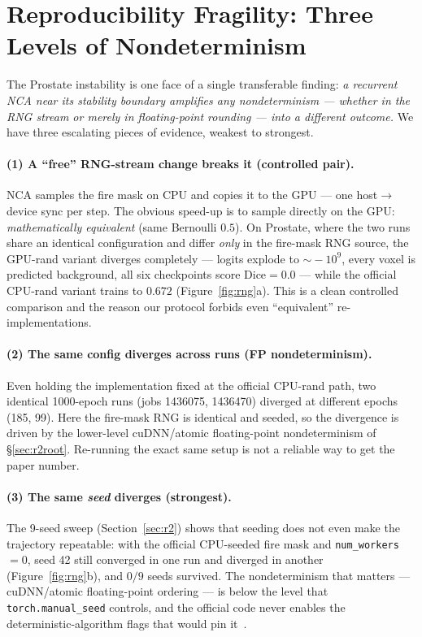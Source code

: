 \documentclass[10pt,twocolumn]{article}
\newcommand{\dice}{\mathrm{Dice}}
\begin{document}
\section{Reproducibility Fragility: Three Levels of Nondeterminism}
\label{sec:rng}

The Prostate instability is one face of a single transferable finding:
\emph{a recurrent NCA near its stability boundary amplifies any
nondeterminism --- whether in the RNG stream or merely in floating-point
rounding --- into a different outcome.} We have three escalating pieces of
evidence, weakest to strongest.

\paragraph{(1) A ``free'' RNG-stream change breaks it (controlled pair).}
NCA samples the fire mask on CPU and copies it to the GPU --- one
host$\rightarrow$device sync per step. The obvious speed-up is to sample
directly on the GPU: \emph{mathematically equivalent} (same Bernoulli
$0.5$). On Prostate, where the two runs share an identical configuration
and differ \emph{only} in the fire-mask RNG source, the GPU-rand variant
diverges completely --- logits explode to $\sim\!-10^9$, every voxel is
predicted background, all six checkpoints score $\dice=0.0$ --- while the
official CPU-rand variant trains to $0.672$ (Figure~\ref{fig:rng}a). This is
a clean controlled comparison and the reason our protocol forbids even
``equivalent'' re-implementations.

\paragraph{(2) The same config diverges across runs (FP nondeterminism).}
Even holding the implementation fixed at the official CPU-rand path, two
identical 1000-epoch runs (jobs 1436075, 1436470) diverged at different
epochs (185, 99). Here the fire-mask RNG is identical and seeded, so the
divergence is driven by the lower-level cuDNN/atomic floating-point
nondeterminism of \S\ref{sec:r2root}. Re-running the exact same setup is
not a reliable way to get the paper number.

\paragraph{(3) The same \emph{seed} diverges (strongest).}
The 9-seed sweep (Section~\ref{sec:r2}) shows that seeding does not even
make the trajectory repeatable: with the official CPU-seeded fire mask and
\texttt{num\_workers}$=0$, seed 42 still converged in one run and diverged
in another (Figure~\ref{fig:rng}b), and $0/9$ seeds survived. The
nondeterminism that matters --- cuDNN/atomic floating-point ordering --- is
below the level that \texttt{torch.manual\_seed} controls, and the official
code never enables the deterministic-algorithm flags that would pin
it~\cite{pytorch_repro}.
\end{document}
